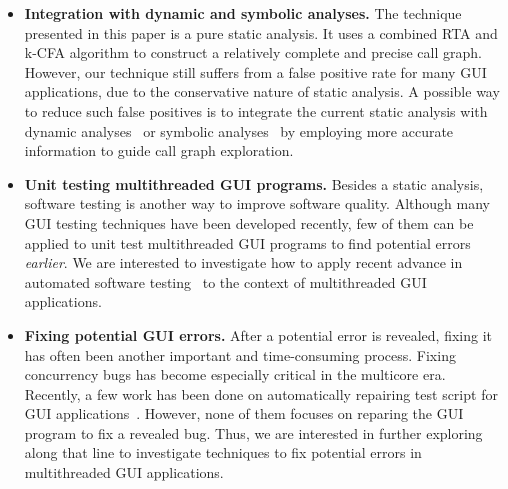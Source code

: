 \begin{itemize}

\item \textbf{Integration with dynamic and symbolic analyses.} The technique 
presented in this paper is a pure static analysis. It
uses a combined RTA and k-CFA  algorithm to construct a relatively
complete and precise call graph. However, our technique still suffers from
a false positive rate for many GUI applications, due to the conservative
nature of static analysis. A possible way to reduce such false
positives is to integrate the current static analysis with
dynamic analyses~\cite{Jiang:2008:PPS:1453101.1453110, ZhangSBE2011}
or symbolic analyses~\cite{xie05:symstra, Pasareanu:2011, halfond09issta, BMF97}
by employing more accurate information to guide call graph exploration.

\item \textbf{Unit testing multithreaded GUI programs.} Besides
a static analysis,  software testing is another
way to improve software quality.  Although many
GUI testing techniques have been developed recently, few of them can be applied
to unit test multithreaded GUI programs to find potential errors \textit{earlier}. We
are interested to investigate how to apply recent advance in automated
software testing~\cite{Staats:2011:PTO:1985793.1985847, Jagannath:2011:IMU:2025113.2025145, Muccini_Bertolino_Inverardi_2004, Ricca:2001:ATW:381473.381476, Harman:2007}
to the context of multithreaded GUI applications.


\item \textbf{Fixing potential GUI errors.} After a potential error is revealed, fixing
it has often been another important and time-consuming process. Fixing concurrency
bugs has become especially critical in the multicore era.
Recently, a few work has been done
on automatically repairing test script for GUI applications~\cite{Daniel:2011:AGR:2002931.2002937, Huang:2010:RGT:1828417.1828465}. However, none of them focuses on reparing
the GUI program to fix a revealed bug. Thus, we are interested in further exploring 
along that line to investigate techniques to fix potential errors in
multithreaded GUI applications.

\end{itemize}
